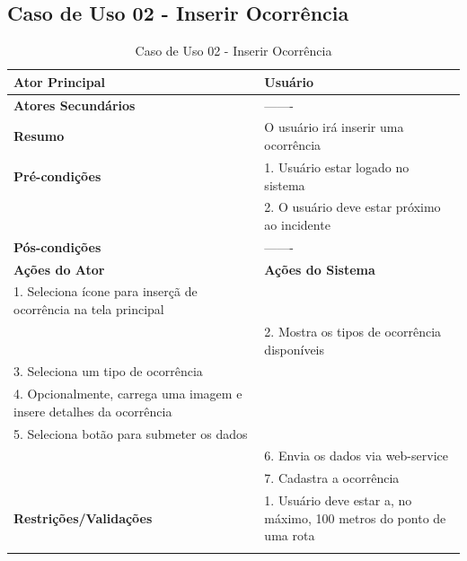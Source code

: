 \subsection{Caso de Uso 02 - Inserir Ocorr\^{e}ncia}
\begin{center}
\begin{longtable}{p{8cm}|p{8cm}}
    \hline
    \textbf{Ator Principal} & Usu\'{a}rio \\
    \hline
    \textbf{Atores Secund\'{a}rios} & ------- \\
    \hline
    \textbf{Resumo} &  O usu\'{a}rio ir\'{a} inserir uma ocorr\^{e}ncia\\
    \hline
    \textbf{Pr\'{e}-condi\c{c}\~{o}es} & 1. Usu\'{a}rio estar logado no sistema\\ \cline{2-2}& 2. O usu\'{a}rio deve estar pr\'{o}ximo ao incidente \\ \cline{2-2}
    \hline
    \textbf{P\'{o}s-condi\c{c}\~{o}es} & ------- \\
    \hline
    \hline
    \textbf{A\c{c}\~{o}es do Ator} & \textbf{A\c{c}\~{o}es do Sistema} \\
    \hline
    1. Seleciona \'{i}cone para inser\c{c}\~{a} de ocorr\^{e}ncia na tela principal & \\
    \hline
    & 2. Mostra os tipos de ocorr\^{e}ncia dispon\'{i}veis\\
    \hline
    3. Seleciona um tipo de ocorr\^{e}ncia & \\
    \hline
    4. Opcionalmente, carrega uma imagem e insere detalhes da ocorr\^{e}ncia & \\
    \hline
    5. Seleciona bot\~{a}o para submeter os dados & \\
    \hline
    & 6. Envia os dados via web-service \\
    \hline
    & 7. Cadastra a ocorr\^{e}ncia\\
    \hline
    \hline
    \textbf{Restri\c{c}\~{o}es/Valida\c{c}\~{o}es} & 1. Usu\'{a}rio deve estar a, no m\'{a}ximo, 100 metros do ponto de uma rota\\
\hline
\caption{Caso de Uso 02 - Inserir Ocorr\^{e}ncia}
\end{longtable}
\end{center}

